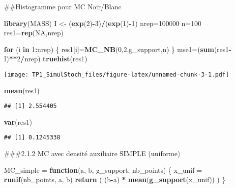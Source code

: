 \documentclass[]{article}
\newenvironment{Shaded}{\begin{snugshade}}{\end{snugshade}}
\newcommand{\ControlFlowTok}[1]{\textcolor[rgb]{0.13,0.29,0.53}{\textbf{#1}}}
\newcommand{\DecValTok}[1]{\textcolor[rgb]{0.00,0.00,0.81}{#1}}
\newcommand{\KeywordTok}[1]{\textcolor[rgb]{0.13,0.29,0.53}{\textbf{#1}}}
\newcommand{\NormalTok}[1]{#1}
\newcommand{\OperatorTok}[1]{\textcolor[rgb]{0.81,0.36,0.00}{\textbf{#1}}}
\newcommand{\OtherTok}[1]{\textcolor[rgb]{0.56,0.35,0.01}{#1}}
\newcommand{\StringTok}[1]{\textcolor[rgb]{0.31,0.60,0.02}{#1}}
\begin{document}
\#\#Histogramme pour MC Noir/Blanc

\begin{Shaded}
\begin{Highlighting}[]
\KeywordTok{library}\NormalTok{(MASS)}
\NormalTok{I <-}\StringTok{ }\NormalTok{(}\KeywordTok{exp}\NormalTok{(}\DecValTok{2}\NormalTok{)}\OperatorTok{-}\DecValTok{3}\NormalTok{)}\OperatorTok{/}\NormalTok{(}\KeywordTok{exp}\NormalTok{(}\DecValTok{1}\NormalTok{)}\OperatorTok{-}\DecValTok{1}\NormalTok{)}
\NormalTok{nrep=}\DecValTok{100000}
\NormalTok{n=}\DecValTok{100}
\NormalTok{res1=}\KeywordTok{rep}\NormalTok{(}\OtherTok{NA}\NormalTok{,nrep)}

\ControlFlowTok{for}\NormalTok{ (i }\ControlFlowTok{in} \DecValTok{1}\OperatorTok{:}\NormalTok{nrep) \{}
\NormalTok{  res1[i]=}\KeywordTok{MC_NB}\NormalTok{(}\DecValTok{0}\NormalTok{,}\DecValTok{2}\NormalTok{,g_support,n)}
\NormalTok{\}}
\NormalTok{mse1=(}\KeywordTok{sum}\NormalTok{(res1}\OperatorTok{-}\NormalTok{I)}\OperatorTok{**}\DecValTok{2}\OperatorTok{/}\NormalTok{nrep)}
\KeywordTok{truehist}\NormalTok{(res1)}
\end{Highlighting}
\end{Shaded}

\texttt{[image: TP1\_SimulStoch\_files/figure-latex/unnamed-chunk-3-1.pdf]}

\begin{Shaded}
\begin{Highlighting}[]
\KeywordTok{mean}\NormalTok{(res1)}
\end{Highlighting}
\end{Shaded}

\begin{verbatim}
## [1] 2.554405
\end{verbatim}

\begin{Shaded}
\begin{Highlighting}[]
\KeywordTok{var}\NormalTok{(res1)}
\end{Highlighting}
\end{Shaded}

\begin{verbatim}
## [1] 0.1245338
\end{verbatim}

\#\#\#2.1.2 MC avec densité auxiliaire SIMPLE (uniforme)

\begin{Shaded}
\begin{Highlighting}[]
\NormalTok{MC_simple =}\StringTok{ }\ControlFlowTok{function}\NormalTok{(a, b, g_support, nb_points)}
\NormalTok{\{}
\NormalTok{  x_unif =}\StringTok{ }\KeywordTok{runif}\NormalTok{(nb_points, a, b)}
  \KeywordTok{return}\NormalTok{ ( (b}\OperatorTok{-}\NormalTok{a) }\OperatorTok{*}\StringTok{ }\KeywordTok{mean}\NormalTok{(}\KeywordTok{g_support}\NormalTok{(x_unif)) )}
\NormalTok{\}}
\end{Highlighting}
\end{Shaded}
\end{document}
